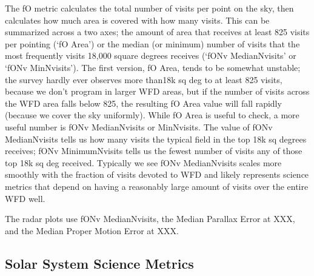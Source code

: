 The fO metric calculates the total number of visits per point on the sky, then calculates how much area is covered with how many visits. This can be summarized across a two axes; the amount of area that receives at least 825 visits per pointing (`fO Area') or the median (or minimum) number of visits that the most frequently visits 18,000 square degrees receives (`fONv MedianNvisits' or `fONv MinNvisits'). The first version, fO Area, tends to be somewhat unstable; the survey hardly ever observes more than18k sq deg to at least 825 visits, because we don't program in larger WFD areas, but if the number of visits across the WFD area falls below 825, the resulting fO Area value will fall rapidly (because we cover the sky uniformly). While fO Area is useful to check, a more useful number is fONv MedianNvisits or MinNvisits. The value of fONv MedianNvisits tells us how many visits the typical field in the top 18k sq degrees receives; fONv MinimumNvisits tells us the fewest number of visits any of those top 18k sq deg received. Typically we see fONv MedianNvisits scales more smoothly with the fraction of visits devoted to WFD and likely represents science metrics that depend on having a reasonably large amount of visits over the entire WFD well. 

The radar plots use fONv MedianNvisits, the Median Parallax Error at XXX, and the Median Proper Motion Error at XXX.

\subsection{Solar System Science Metrics}

